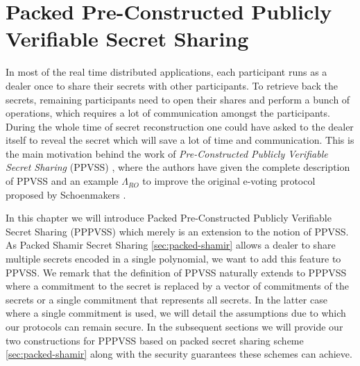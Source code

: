 \chapter{Packed Pre-Constructed Publicly Verifiable Secret Sharing}
\label{cha:3}
In most of the real time distributed applications, each participant runs as a dealer once to share their 
secrets with other participants. To retrieve back the secrets, remaining participants need to open their 
shares and perform a bunch of operations, which requires a lot of communication 
amongst the participants. During the whole time of secret reconstruction one could have asked to the dealer 
itself to reveal the secret which will save a lot of time and communication. This is the main motivation 
behind the work of \textit{Pre-Constructed Publicly Verifiable Secret Sharing} (PPVSS) \cite{cryptoeprint:2025/576}, 
where the authors have given the complete description of PPVSS and an example $\Lambda_{RO}$ to improve 
the original e-voting protocol proposed by Schoenmakers \cite{5581ccd9530540479539d21d1d39ae96}.\par

In this chapter we will introduce Packed Pre-Constructed Publicly Verifiable Secret Sharing (PPPVSS) which merely 
is an extension to the notion of PPVSS. As Packed Shamir Secret Sharing \ref{sec:packed-shamir} allows a 
dealer to share multiple secrets encoded in a single polynomial, we want to add this feature to PPVSS. We remark that 
the definition of PPVSS naturally extends to PPPVSS where a commitment to the secret is replaced 
by a vector of commitments of the secrets or a single commitment that represents all secrets. In the latter case 
where a single commitment is used, we will detail the assumptions due to which our protocols 
can remain secure. In the 
subsequent sections we will provide our two constructions for PPPVSS based on packed secret sharing 
scheme \ref{sec:packed-shamir} along with the security guarantees these schemes can achieve.\par



